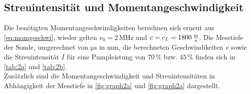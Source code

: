 \subsection{Streuintensität und Momentangeschwindigkeit}

Die benötigten Momentangeschwindigkeiten berechnen sich erneut aus \eqref{eq:momgeschwi}, wieder gelten $\nu_0 = 2 \,\unit{\mega\hertz}$ und $c = c_L = 1800 \,\unit{\frac{\meter}{\second}}$.
Die Messtiefe der Sonde, umgerechnet von $\unit{\micro\second}$ in $\unit{\milli\meter}$, die berechneten Geschwindikeiten $v$ sowie die Streuintensität $I$ für eine Pumpleistung von $70 \,\%$ bzw. $45 \,\%$ finden sich in \autoref{tab:2a} und \autoref{tab:2b}. \\

Zusätzlich sind die Momentangeschwindigkeit und Streuintensitäten in Abhängigkeit der Messtiefe in \autoref{fig:graph2a} und \autoref{fig:graph2a} dargestellt.

